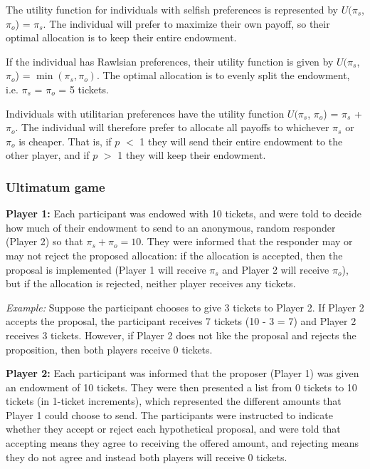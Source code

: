 \documentclass[12pt]{article}
\begin{document}
The utility function for individuals with selfish preferences is represented by \(U(\pi_{s}\), \(\pi_{o}\)) = \(\pi_{s}\). The individual will prefer to maximize their own payoff, so their optimal allocation is to keep their entire endowment.

If the individual has Rawlsian preferences, their utility function is given by \(U(\pi_{s}\), \(\pi_{o}\)) = \(\min(\pi_{s}, \pi_{o})\). The optimal allocation is to evenly split the endowment, i.e. \(\pi_{s}\) = \(\pi_{o}\) = 5 tickets.

Individuals with utilitarian preferences have the utility function \(U(\pi_{s}\), \(\pi_{o}\)) = \(\pi_{s}\) + \(\pi_{o}\). The individual will therefore prefer to allocate all payoffs to whichever \(\pi_{s}\) or \(\pi_{o}\) is cheaper. That is, if \(p\) $<$ 1 they will send their entire endowment to the other player, and if \(p\) $>$ 1 they will keep their endowment.


\subsubsection{Ultimatum game}

\textbf{Player 1:} Each participant was endowed with 10 tickets, and were told to decide how much of their endowment to send to an anonymous, random responder (Player 2) so that \(\pi_{s} + \pi_{o} = 10\). They were informed that the responder may or may not reject the proposed allocation: if the allocation is accepted, then the proposal is implemented (Player 1 will receive \(\pi_{s}\) and Player 2 will receive \(\pi_{o}\)), but if the allocation is rejected, neither player receives any tickets.

\textit{Example:} Suppose the participant chooses to give 3 tickets to Player 2. If Player 2 accepts the proposal, the participant receives 7 tickets (10 - 3 = 7) and Player 2 receives 3 tickets. However, if Player 2 does not like the proposal and rejects the proposition, then both players receive 0 tickets.
 
\textbf{Player 2:} Each participant was informed that the proposer (Player 1) was given an endowment of 10 tickets. They were then presented a list from 0 tickets to 10 tickets (in 1-ticket increments), which represented the different amounts that Player 1 could choose to send. The participants were instructed to indicate whether they accept or reject each hypothetical proposal, and were told that accepting means they agree to receiving the offered amount, and rejecting means they do not agree and instead both players will receive 0 tickets.
\end{document}
